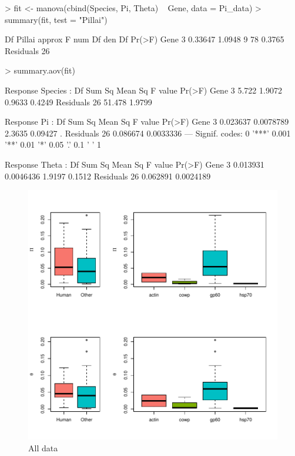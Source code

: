 \documentclass{article}
\begin{document}
\begin{Schunk}
\begin{Sinput}
> fit <- manova(cbind(Species, Pi, Theta) ~ Gene, data = Pi_data)
> summary(fit, test = "Pillai")
\end{Sinput}
\begin{Soutput}
          Df  Pillai approx F num Df den Df Pr(>F)
Gene       3 0.33647   1.0948      9     78 0.3765
Residuals 26                                      
\end{Soutput}
\begin{Sinput}
> summary.aov(fit)
\end{Sinput}
\begin{Soutput}
 Response Species :
            Df Sum Sq Mean Sq F value Pr(>F)
Gene         3  5.722  1.9072  0.9633 0.4249
Residuals   26 51.478  1.9799               

 Response Pi :
            Df   Sum Sq   Mean Sq F value  Pr(>F)  
Gene         3 0.023637 0.0078789  2.3635 0.09427 .
Residuals   26 0.086674 0.0033336                  
---
Signif. codes:  0 '***' 0.001 '**' 0.01 '*' 0.05 '.' 0.1 ' ' 1

 Response Theta :
            Df   Sum Sq   Mean Sq F value Pr(>F)
Gene         3 0.013931 0.0046436  1.9197 0.1512
Residuals   26 0.062891 0.0024189               
\end{Soutput}
\end{Schunk}

\begin{figure}
\includegraphics{Fig-test3}
\caption{All data}
\label{fig:w}
\end{figure}
\end{document}

